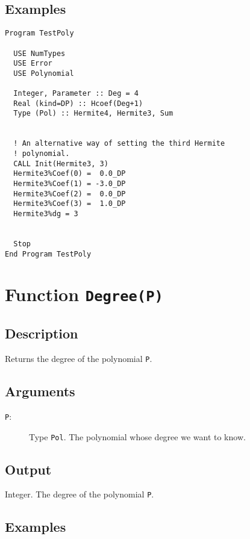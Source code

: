\subsection{Examples}

\begin{lstlisting}[emph=Init,
                   emphstyle=\color{blue},
                   frame=trBL,
                   caption=Initialising a polynomial data type.,
                   label=initpol]
Program TestPoly

  USE NumTypes
  USE Error
  USE Polynomial

  Integer, Parameter :: Deg = 4
  Real (kind=DP) :: Hcoef(Deg+1)
  Type (Pol) :: Hermite4, Hermite3, Sum


  ! An alternative way of setting the third Hermite
  ! polynomial.
  CALL Init(Hermite3, 3)
  Hermite3%Coef(0) =  0.0_DP
  Hermite3%Coef(1) = -3.0_DP
  Hermite3%Coef(2) =  0.0_DP
  Hermite3%Coef(3) =  1.0_DP
  Hermite3%dg = 3


  Stop
End Program TestPoly
\end{lstlisting}

\section{Function \texttt{Degree(P)}}

\subsection{Description}

Returns the degree of the polynomial \texttt{P}.

\subsection{Arguments}

\begin{description}
\item[\texttt{P}:] Type \texttt{Pol}. The polynomial whose degree we want to
  know.  
\end{description}

\subsection{Output}

Integer. The degree of the polynomial \texttt{P}.

\subsection{Examples}

